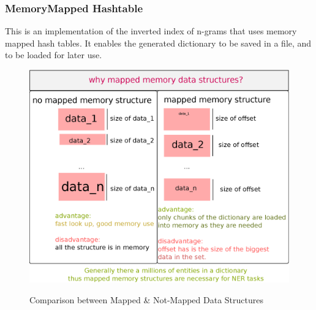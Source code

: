 \subsubsection{MemoryMapped Hashtable}
This is an implementation of the inverted index of n-grams that uses memory mapped hash tables. It enables the generated dictionary to be saved in a file, and to be loaded for later use.

\begin{figure}[h!]
  \caption{Comparison between Mapped \& Not-Mapped Data Structures}
  \centering
    \includegraphics[scale=0.5]{graphics/memoryMappedVsNonMemoryMapped}
   \label{fig:mappedDataStructures}  
\end{figure}


  
